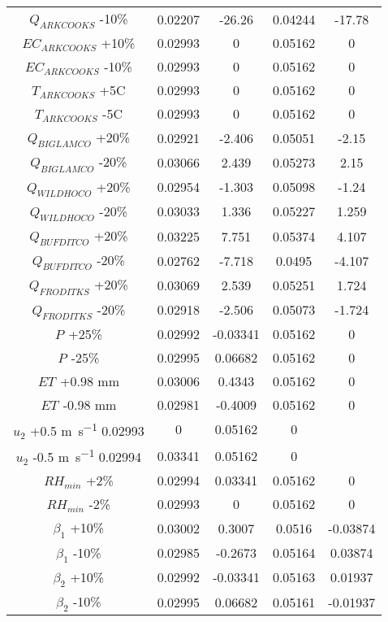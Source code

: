 \begin{linenumbers}
\begin{spacing}{1.0}
\begin{center}
\begin{longtable}{c|cc|cc}
	$Q_{ARKCOOKS}$ -10\%&				0.02207&	-26.26&	0.04244&	-17.78\\      
	$EC_{ARKCOOKS}$ +10\%&				0.02993&	0&	0.05162&	0\\               
	$EC_{ARKCOOKS}$ -10\%&				0.02993&	0&	0.05162&	0\\               
	$T_{ARKCOOKS}$ +5C&					0.02993&	0&	0.05162&	0\\               
	$T_{ARKCOOKS}$ -5C&					0.02993&	0&	0.05162&	0\\               
	$Q_{BIGLAMCO}$ +20\%&				0.02921&	-2.406&	0.05051&	-2.15\\       
	$Q_{BIGLAMCO}$ -20\%&				0.03066&	2.439&	0.05273&	2.15\\        
	$Q_{WILDHOCO}$ +20\%&				0.02954&	-1.303&	0.05098&	-1.24\\       
	$Q_{WILDHOCO}$ -20\%&				0.03033&	1.336&	0.05227&	1.259\\       
	$Q_{BUFDITCO}$ +20\%&				0.03225&	7.751&	0.05374&	4.107\\       
	$Q_{BUFDITCO}$ -20\%&				0.02762&	-7.718&	0.0495&	-4.107\\          
	$Q_{FRODITKS}$ +20\%&				0.03069&	2.539&	0.05251&	1.724\\       
	$Q_{FRODITKS}$ -20\%&				0.02918&	-2.506&	0.05073&	-1.724\\      
	$P_{}$ +25\%&						0.02992&	-0.03341&	0.05162&	0\\       
	$P_{}$ -25\%&						0.02995&	0.06682&	0.05162&	0\\       
	$ET_{}$ +0.98 mm&					0.03006&	0.4343&	0.05162&	0\\           
	$ET_{}$ -0.98 mm&					0.02981&	-0.4009&	0.05162&	0\\       
	$u_{2}$ +0.5 \si{\meter\per\second}	0.02993&	0&	0.05162&	0\\               
	$u_{2}$ -0.5 \si{\meter\per\second}	0.02994&	0.03341&	0.05162&	0\\       
	$RH_{min}$ +2\%&					0.02994&	0.03341&	0.05162&	0\\       
	$RH_{min}$ -2\%&					0.02993&	0&	0.05162&	0\\               
	$\beta_{1}$ +10\%&					0.03002&	0.3007&	0.0516&	-0.03874\\        
	$\beta_{1}$ -10\%&					0.02985&	-0.2673&	0.05164&	0.03874\\ 
	$\beta_{2}$ +10\%&					0.02992&	-0.03341&	0.05163&	0.01937\\ 
	$\beta_{2}$ -10\%&					0.02995&	0.06682&	0.05161&	-0.01937\\

\end{longtable}
\end{center}
\end{spacing}
\end{linenumbers}
